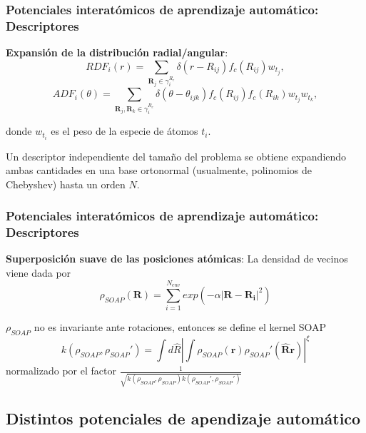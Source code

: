 \documentclass[aspectratio=169]{beamer}
\let\oldtextbf\textbf
\renewcommand{\textbf}[1]{\textcolor{nordblue}{\oldtextbf{#1}}}
\begin{document}
    \begin{frame}
        \frametitle{Potenciales interatómicos de aprendizaje automático: Descriptores}

        \textbf{Expansión de la distribución radial/angular}:
        $$
        RDF_i(r) = \sum_{\mathbf{R}_j \in \gamma_i^{R_c}} \delta(r - R_{ij}) f_c(R_{ij}) w_{t_j},
        $$
        $$
        ADF_i(\theta) = \sum_{\mathbf{R}_j, \mathbf{R}_k \in \gamma_i^{R_c}} \delta(\theta - \theta_{ijk}) f_c(R_{ij}) f_c(R_{ik}) w_{t_j} w_{t_k},
        $$

        donde $w_{t_i}$ es el peso de la especie de átomos $t_i$.
        
        \pause

        Un descriptor independiente del tamaño del problema se obtiene expandiendo
        ambas cantidades en una base ortonormal (usualmente, polinomios de 
        Chebyshev) hasta un orden $N$.

    \end{frame}
    
    \begin{frame}
        \frametitle{Potenciales interatómicos de aprendizaje automático: Descriptores}

        \textbf{Superposición suave de las posiciones atómicas}: La densidad
        de vecinos viene dada por
        $$
        \rho_{SOAP}(\mathbf{R}) = \sum_{i=1}^{N_{env}} exp(-\alpha |\mathbf{R} - \mathbf{R_i}|^2)
        $$

        \pause

        $\rho_{SOAP}$ no es invariante ante rotaciones, entonces se define el 
        kernel SOAP
        $$
        k(\rho_{SOAP}, \rho_{SOAP}') = \int d\hat{R} \left|\int \rho_{SOAP}(\mathbf{r}) \rho_{SOAP}'(\mathbf{\hat{R}r})\right|^{\xi}
        $$
        normalizado por el factor $\frac{1}{\sqrt{k(\rho_{SOAP}, \rho_{SOAP}) k(\rho_{SOAP}', \rho_{SOAP}')}}$

    \end{frame}

    \subsection{Distintos potenciales de apendizaje automático}
\end{document}
